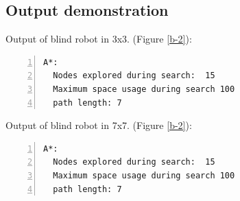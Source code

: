 \documentclass{article}
\begin{document}
\subsection{Output demonstration}

Output of blind robot in 3x3. (Figure \ref{b-2}):
\begin{lstlisting}[numbers=left]
A*:  
  Nodes explored during search:  15
  Maximum space usage during search 100
  path length: 7
\end{lstlisting}

Output of blind robot in 7x7. (Figure \ref{b-2}):
\begin{lstlisting}[numbers=left]
A*:  
  Nodes explored during search:  15
  Maximum space usage during search 100
  path length: 7
\end{lstlisting}
\end{document}
